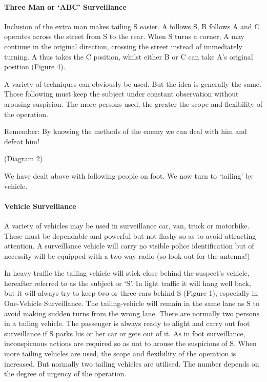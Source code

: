 \paragraph{\texorpdfstring{Three Man or `ABC'
Surveillance}{Three Man or ABC Surveillance}}

Inclusion of the extra man makes tailing S easier. A follows S, B
follows A and C operates across the street from S to the rear. When S
turns a corner, A may continue in the original direction, crossing the
street instead of immediately turning. A thus takes the C position,
whilst either B or C can take A's original position (Figure 4).

A variety of techniques can obviously be used. But the idea is generally
the same. Those following must keep the subject under constant
observation without arousing suspicion. The more persons used, the
greater the scope and flexibility of the operation.

Remember: By knowing the methods of the enemy we can deal with him and
defeat him!

(Diagram 2)

We have dealt above with following people on foot. We now turn to
`tailing' by vehicle.

\paragraph{Vehicle Surveillance}

A variety of vehicles may be used in surveillance car, van, truck or
motorbike. These must be dependable and powerful but not flashy so as to
avoid attracting attention. A surveillance vehicle will carry no visible
police identification but of necessity will be equipped with a two-way
radio (so look out for the antenna!)

In heavy traffic the tailing vehicle will stick close behind the
suspect's vehicle, hereafter referred to as the subject or `S'. In light
traffic it will hang well back, but it will always try to keep two or
three cars behind S (Figure 1), especially in One-Vehicle Surveillance.
The tailing-vehicle will remain in the same lane as S to avoid making
sudden turns from the wrong lane. There are normally two persons in a
tailing vehicle. The passenger is always ready to alight and carry out
foot surveillance if S parks his or her car or gets out of it. As in
foot surveillance, inconspicuous actions are required so as not to
arouse the suspicions of S. When more tailing vehicles are used, the
scope and flexibility of the operation is increased. But normally two
tailing vehicles are utilised. The number depends on the degree of
urgency of the operation.

